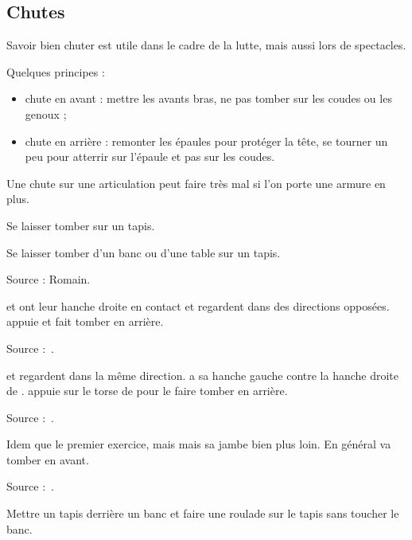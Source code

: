 \subsection{Chutes}

Savoir bien chuter est utile dans le cadre de la lutte, mais aussi lors de spectacles.

Quelques principes :
\begin{itemize}
	\item chute en avant : mettre les avants bras, ne pas tomber sur les coudes ou les genoux ;
	\item chute en arrière : remonter les épaules pour protéger la tête, se tourner un peu pour atterrir sur l'épaule et pas sur les coudes.
\end{itemize}
Une chute sur une articulation peut faire très mal si l'on porte une armure en plus.


\begin{exercice}[Chute]

Se laisser tomber sur un tapis.

\end{exercice}


\begin{exercice}

Se laisser tomber d'un banc ou d'une table sur un tapis.

Source : Romain.

\end{exercice}


\begin{exercice}
\A et \D ont leur hanche droite en contact et regardent dans des directions opposées.
\A appuie et fait tomber \D en arrière.

Source :~\cite{petit:dijon:close_longword:2015}.
\end{exercice}


\begin{exercice}
\A et \D regardent dans la même direction.
\A a sa hanche gauche contre la hanche droite de \D.
\A appuie sur le torse de \D pour le faire tomber en arrière.

Source :~\cite{petit:dijon:close_longword:2015}.
\end{exercice}


\begin{exercice}
Idem que le premier exercice, mais \A mais sa jambe bien plus loin.
En général \D va tomber en avant.

Source :~\cite{petit:dijon:close_longword:2015}.
\end{exercice}


\begin{exercice}
Mettre un tapis derrière un banc et faire une roulade sur le tapis sans toucher le banc.
\end{exercice}

